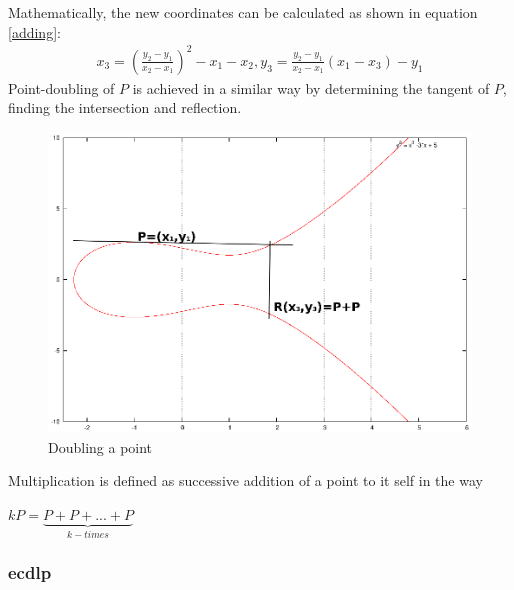 Mathematically, the new coordinates can be calculated as shown in equation \ref{adding}:
\begin{align}\label{adding}
x_3 = (\frac{y_2-y_1}{x_2-x_1})^2-x_1-x_2, y_3=\frac{y_2-y_1}{x_2-x_1}(x_1-x_3)-y_1
\end{align}   
Point-doubling of $P$ is achieved in a similar way by determining the tangent of $P$, finding the intersection and reflection.
          \begin{figure}[H]
	    \centering
              \includegraphics[width=0.6\linewidth]{figures/doubleEC.eps}
              \caption{Doubling a point}
              \label{fig:ecDouble}
          \end{figure}
% 
% 
Multiplication is defined as successive addition of a point to it self in the way
\begin{center}
 $kP = \underbrace{P+P+...+P}_{k-times}$
\end{center}


\subsubsection{\gls{ecdlp}}\label{ecdp}


